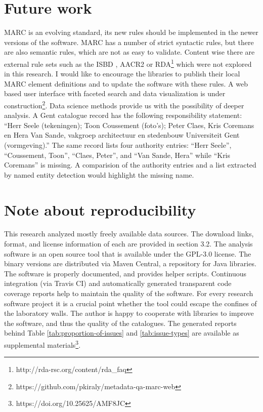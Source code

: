 

\section{Future work}

MARC is an evolving standard, its new rules should be implemented in the newer versions of the software. MARC has a number of strict syntactic rules, but there are also semantic rules, which are not as easy to validate. Content wise there are external rule sets such as the ISBD \cite{isbd}, AACR2 \cite{aacr2} or RDA\footnote{http://rda-rsc.org/content/rda\_faq} which were not explored in this research. I would like to encourage the libraries to publish their local MARC element definitions and to update the software with these rules. A web based user interface with faceted search and data visualization is under construction\footnote{https://github.com/pkiraly/metadata-qa-marc-web}. Data science methods provide us with the possibility of deeper analysis. A Gent catalogue record has the following responsibility statement: ``Herr Seele (tekeningen); Toon Coussement (foto's); Peter Claes, Kris Coremans en Hera Van Sande, vakgroep architectuur en stedenbouw Universiteit Gent (vormgeving).'' The same record lists four authority entries: ``Herr Seele'', ``Coussement, Toon'', ``Claes, Peter'', and ``Van Sande, Hera'' while ``Kris Coremans'' is missing. A comparision of the authority entries and a list extracted by named entity detection would highlight the missing name.

\section{Note about reproducibility}

This research analyzed mostly freely available data sources. The download links, format, and license information of each are provided in section 3.2. The analysis software is an open source tool that is available under the GPL-3.0 license. The binary versions are distributed via Maven Central, a repository for Java libraries. The software is properly documented, and provides helper scripts. Continuous integration (via Travis CI) and automatically generated transparent code coverage reports help to maintain the quality of the software. For every research software project it is a crucial point whether the tool could escape the confines of the laboratory walls. The author is happy to cooperate with libraries to improve the software, and thus the quality of the catalogues. The generated reports behind Table \ref{tab:proportion-of-issues} and \ref{tab:issue-types} are available as supplemental materials\footnote{https://doi.org/10.25625/AMF8JC}.

